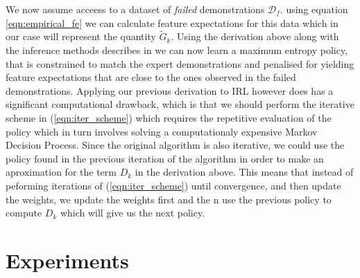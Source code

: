 \documentclass[letterpaper]{article}
\begin{document}
We now assume acceess to a dataset of \emph{failed} demonstrations $\mathcal{D}_f$.
using equation \ref{eqn:empirical_fe} we can calculate feature expectations for this data
which in our case will represent the quantity $\widetilde{G}_k$. Using the derivation above along with the
inference methods describes in \cite{ziebart2010modelingthesis} we can now learn a maximum entropy policy, that is 
constrained to match the expert demonstrations and penalised for yielding feature expectations that are close
to the ones observed in the failed demonstrations. Applying our previous derivation to IRL however does
has a significant computational drawback, which is that we should perform the iterative scheme in (\ref{eqn:iter_scheme})
which requires the repetitive evaluation of the policy which in turn involves solving a computationaly expensive Markov Decision Process. Since the original algorithm is also iterative, we could use the policy found in the
previous iteration of the algorithm in order to make an aproximation for the term $D_k$ in the derivation above. This means that
instead of peforming iterations of (\ref{eqn:iter_scheme}) until convergence, and then update the weights, we update the weights first
and the n use the previous policy to compute $D_k$ which will give us the next policy.

\section{Experiments}
\end{document}
